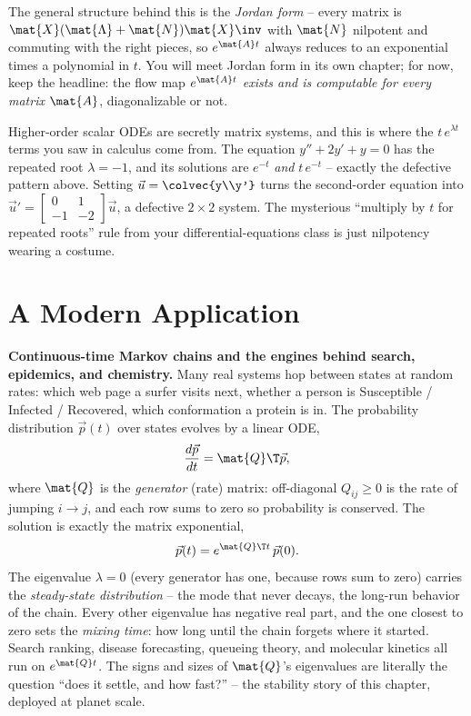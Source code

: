 \begin{remark}
The general structure behind this is the \emph{Jordan form} -- every matrix is
$\mat{X}(\mat{\Lambda}+\mat{N})\mat{X}\inv$ with $\mat{N}$ nilpotent and
commuting with the right pieces, so $e^{\mat{A}t}$ always reduces to an
exponential times a polynomial in $t$. You will meet Jordan form in its own
chapter; for now, keep the headline: the flow map $e^{\mat{A}t}$ \emph{exists and
is computable for every matrix $\mat{A}$}, diagonalizable or not.
\end{remark}

\begin{connectionbox}
Higher-order scalar ODEs are secretly matrix systems, and this is where the
$t\,e^{\lambda t}$ terms you saw in calculus come from. The equation
$y'' + 2y' + y = 0$ has the repeated root $\lambda=-1$, and its solutions are
$e^{-t}$ \emph{and} $t\,e^{-t}$ -- exactly the defective pattern above. Setting
$\vec{u}=\colvec{y\\y'}$ turns the second-order equation into
$\vec{u}'=\begin{bmatrix}0&1\\-1&-2\end{bmatrix}\vec{u}$, a defective $2\times2$
system. The mysterious ``multiply by $t$ for repeated roots'' rule from your
differential-equations class is just nilpotency wearing a costume.
\end{connectionbox}

\section{A Modern Application}
\label{ch25:application}

\begin{applicationbox}
\textbf{Continuous-time Markov chains and the engines behind search,
epidemics, and chemistry.} Many real systems hop between states at random rates:
which web page a surfer visits next, whether a person is Susceptible /
Infected / Recovered, which conformation a protein is in. The probability
distribution $\vec{p}(t)$ over states evolves by a linear ODE,
\[
  \frac{d\vec{p}}{dt} = \mat{Q}\T\vec{p},
\]
where $\mat{Q}$ is the \emph{generator} (rate) matrix: off-diagonal $Q_{ij}\ge0$
is the rate of jumping $i\to j$, and each row sums to zero so probability is
conserved. The solution is exactly the matrix exponential,
\[
  \vec{p}(t) = e^{\mat{Q}\T t}\,\vec{p}(0).
\]
The eigenvalue $\lambda=0$ (every generator has one, because rows sum to zero)
carries the \emph{steady-state distribution} -- the mode that never decays, the
long-run behavior of the chain. Every other eigenvalue has negative real part, and
the one closest to zero sets the \emph{mixing time}: how long until the chain
forgets where it started. Search ranking, disease forecasting, queueing theory,
and molecular kinetics all run on $e^{\mat{Q}t}$. The signs and sizes of
$\mat{Q}$'s eigenvalues are literally the question ``does it settle, and how
fast?'' -- the stability story of this chapter, deployed at planet scale.
\end{applicationbox}

